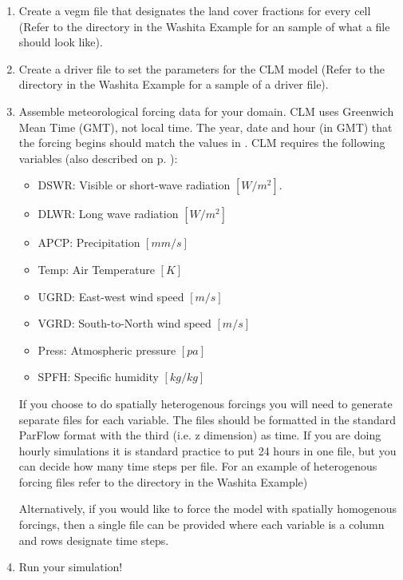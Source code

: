\begin{enumerate}
   \item Create a  vegm file that designates the land cover fractions for every 
   cell (Refer to the  directory in the Washita Example for an sample of 
   what a  file should look like).

   \item Create a  driver file to set the parameters for the CLM model (Refer to the 
    directory in the Washita Example for a sample of a  driver file).

   \item Assemble meteorological forcing data for your domain. CLM uses Greenwich Mean Time (GMT), not local time. The year, date and hour (in GMT) that the forcing begins should match the values in .  CLM requires the following 
   variables (also described on p. \pageref{clm_forcing}): 
   
   \begin{itemize}
		\item DSWR: Visible or short-wave radiation $[W/m^2]$.
		\item DLWR: Long wave radiation $[W/m^2]$
		\item APCP: Precipitation $[mm/s]$
		\item Temp: Air Temperature $[K]$
		\item UGRD: East-west wind speed $[m/s]$
                \item VGRD: South-to-North wind speed $[m/s]$
		\item Press: Atmospheric pressure $[pa]$
		\item SPFH:	Specific humidity $[kg/kg]$
	\end{itemize}
	
	If you choose to do spatially heterogenous forcings you will need to generate separate 
	files for each variable. The files should be formatted in the standard ParFlow format 
	with the third (i.e. z dimension) as time. If you are doing hourly simulations it is 
	standard practice to put 24 hours in one file, but you can decide how many time steps per 
	file. For an example of heterogenous forcing files refer to the  directory
	in the Washita Example)

	Alternatively, if you would like to force the model with spatially homogenous forcings, 
	then a single file can be provided where each variable is a column and rows designate 
	time steps. 

   \item Run your simulation!
   
\end{enumerate}

